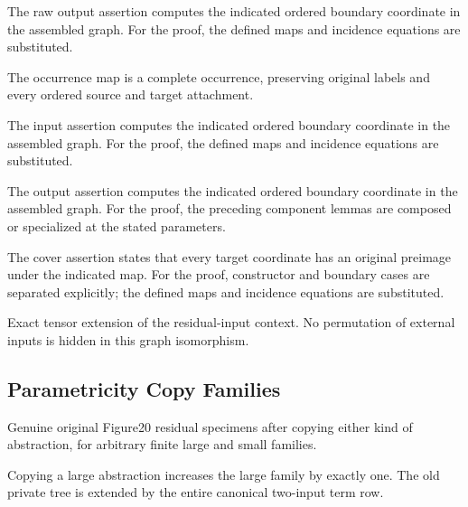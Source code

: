 The raw output assertion computes the indicated ordered boundary coordinate in the assembled graph.
For the proof, the defined maps and incidence equations are substituted.
\par{}

The occurrence map is a complete occurrence, preserving original labels and every ordered source and target attachment.
\par{}

The input assertion computes the indicated ordered boundary coordinate in the assembled graph.
For the proof, the defined maps and incidence equations are substituted.
\par{}

The output assertion computes the indicated ordered boundary coordinate in the assembled graph.
For the proof, the preceding component lemmas are composed or specialized at the stated parameters.
\par{}

The cover assertion states that every target coordinate has an original preimage under the indicated map.
For the proof, constructor and boundary cases are separated explicitly; the defined maps and incidence equations are substituted.
\par{}

Exact tensor extension of the residual-input context. No permutation of external inputs is hidden in this graph isomorphism.
\par{}

\subsection{Parametricity Copy Families}
Genuine original Figure20 residual specimens after copying either kind of abstraction, for arbitrary finite large and small families.

Copying a large abstraction increases the large family by exactly one. The old private tree is extended by the entire canonical two-input term row.
\par{}

